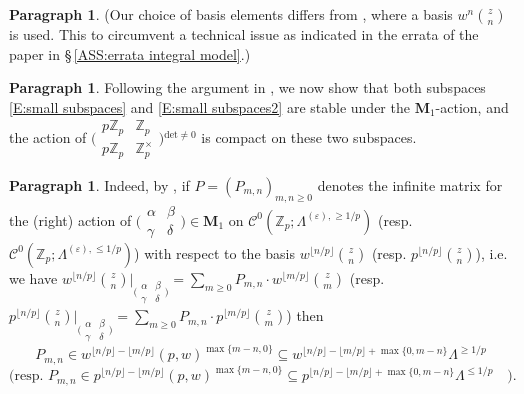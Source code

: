 \documentclass[12pt]{amsart}
\theoremstyle{definition}
\newtheorem{para}[subsection]{Paragraph}
\numberwithin{equation}{subsection}
\def\calC{\mathcal{C}}
\def\ZZ{\mathbb{Z}}
\def\bfM{\mathbf{M}}
\renewcommand{\det}{\mathrm{det}}
\newcommand{\Matrix}[4]{{\big(\begin{smallmatrix}#1&#2\\#3& #4\end{smallmatrix} \big)}}
\begin{document}
\begin{para}
\label{P:para_080}
(Our choice of basis elements differs from \cite[\S\,5.4]{liu-wan-xiao}, where a basis $w^n\binom zn$ is used. This to circumvent a technical issue as indicated in the errata of the paper in \S\,\ref{ASS:errata integral model}.)
\end{para}

\begin{para}
\label{P:para_081}
Following the argument in \cite[\S\,5.4]{liu-wan-xiao}, we now show that both subspaces \eqref{E:small subspaces} and \eqref{E:small subspaces2} are stable under the $\bfM_1$-action, and the action of $\Matrix{p\ZZ_p}{\ZZ_p}{p\ZZ_p}{\ZZ_p^\times}{}^{\det \neq 0}$ is compact on these two subspaces. %
\end{para}

\begin{para}
\label{P:para_082}
Indeed, by \cite[Proposition~3.14\,(2)]{liu-wan-xiao}, if $P = (P_{m,n})_{m,n \geq 0}$ denotes the infinite matrix for the (right) action of $\Matrix \alpha\beta\gamma\delta \in \bfM_1$ on $\calC^0(\ZZ_p;\Lambda^{(\varepsilon),\geq 1/p})$ (resp. $\calC^0(\ZZ_p;\Lambda^{(\varepsilon),\leq 1/p})$)  with respect to the basis $w^{\lfloor n/p\rfloor}\binom zn$ (resp. $p^{\lfloor n/p \rfloor} \binom zn$), i.e. we have $w^{\lfloor n/p \rfloor}\binom zn |_{\Matrix \alpha\beta\gamma\delta}=\sum\limits_{m\geq 0} P_{m,n}\cdot w^{\lfloor m/p \rfloor}\binom zm$ (resp. $p^{\lfloor n/p \rfloor}\binom zn |_{\Matrix \alpha\beta\gamma\delta}=\sum\limits_{m\geq 0} P_{m,n}\cdot p^{\lfloor m/p \rfloor}\binom zm$)
 then
\[
P_{m,n} \in w^{\lfloor n/p\rfloor-\lfloor m/p\rfloor} (p, w)^{\max\{m-n,0\}} \subseteq w^{\lfloor n/p\rfloor-\lfloor m/p\rfloor+ \max\{0,m-n\}} \Lambda^{\geq 1/p}
\]
\[
\textrm{(resp. }P_{m,n} \in p^{\lfloor n/p\rfloor-\lfloor m/p\rfloor} (p, w)^{\max\{m-n,0\}} \subseteq p^{\lfloor n/p\rfloor-\lfloor m/p\rfloor+ \max\{0,m-n\}} \Lambda^{\leq 1/p}\quad ).
\]
\end{para}
\end{document}
